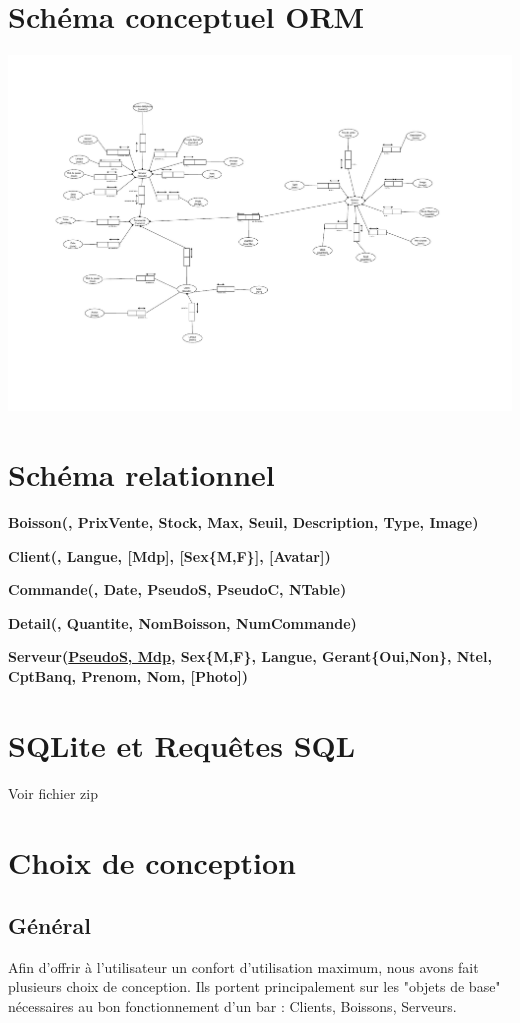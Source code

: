 \documentclass{article}
\begin{document}
\section{Schéma conceptuel ORM}
\vspace{-0.2cm}
\hspace{-2cm}
\includegraphics[scale=1, angle=90, trim=3 20 115 3, clip=true]{img/ORM_final.pdf}

\section{Schéma relationnel}
\textbf{Boisson(, PrixVente, Stock, Max, Seuil, Description, Type, Image)}

\textbf{Client(, Langue, [Mdp], [Sex\{M,F\}], [Avatar])}

\textbf{Commande(, Date, PseudoS, PseudoC, NTable)}

\textbf{Detail(, Quantite, NomBoisson, NumCommande)}

\textbf{Serveur(\ul{PseudoS, Mdp}, Sex\{M,F\}, Langue, Gerant\{Oui,Non\}, Ntel, CptBanq, Prenom, Nom, [Photo])} 

\section{SQLite et Requêtes SQL}
Voir fichier zip

\section{Choix de conception}
\subsection{Général}
Afin d'offrir à l'utilisateur un confort d'utilisation maximum, nous avons fait plusieurs choix de conception. Ils portent principalement sur les "objets de base" nécessaires au bon fonctionnement d'un bar : Clients, Boissons, Serveurs.
\end{document}
